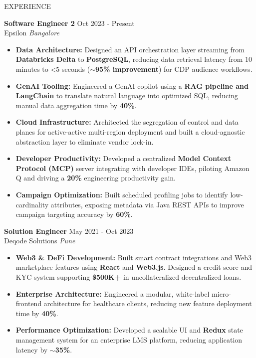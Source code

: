 \documentclass{resume} %
\begin{document}
\begin{rSection}{EXPERIENCE}

\textbf{Software Engineer 2} \hfill Oct 2023 - Present\\
Epsilon \hfill \textit{Bangalore}

\begin{itemize}
    \itemsep -3pt {} 
    \item \textbf{Data Architecture:} Designed an API orchestration layer streaming from \textbf{Databricks Delta} to \textbf{PostgreSQL}, reducing data retrieval latency from 10 minutes to <5 seconds (\textbf{$\sim$95\% improvement}) for CDP audience workflows.
    \item \textbf{GenAI Tooling:} Engineered a GenAI copilot using a \textbf{RAG pipeline and LangChain} to translate natural language into optimized SQL, reducing manual data aggregation time by \textbf{40\%}.
    \item \textbf{Cloud Infrastructure:} Architected the segregation of control and data planes for active-active multi-region deployment and built a cloud-agnostic abstraction layer to eliminate vendor lock-in.
    \item \textbf{Developer Productivity:} Developed a centralized \textbf{Model Context Protocol (MCP)} server integrating with developer IDEs, piloting Amazon Q and driving a \textbf{20\%} engineering productivity gain.
    \item \textbf{Campaign Optimization:} Built scheduled profiling jobs to identify low-cardinality attributes, exposing metadata via Java REST APIs to improve campaign targeting accuracy by \textbf{60\%}.
\end{itemize}
 
\textbf{Solution Engineer} \hfill May 2021 - Oct 2023\\
Deqode Solutions \hfill \textit{Pune}

\begin{itemize}
    \itemsep -3pt {} 
    \item \textbf{Web3 \& DeFi Development:} Built smart contract integrations and Web3 marketplace features using \textbf{React} and \textbf{Web3.js}. Designed a credit score and KYC system supporting \textbf{\$500K+} in uncollateralized decentralized loans.
    \item \textbf{Enterprise Architecture:} Engineered a modular, white-label micro-frontend architecture for healthcare clients, reducing new feature deployment time by \textbf{40\%}.
    \item \textbf{Performance Optimization:} Developed a scalable UI and \textbf{Redux} state management system for an enterprise LMS platform, reducing application latency by \textbf{$\sim$35\%}.
\end{itemize}

\end{rSection} 
\end{document}
